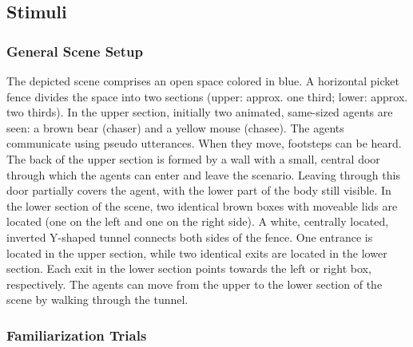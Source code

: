 \documentclass[
  man, donotrepeattitle,floatsintext]{apa6}
\begin{document}
\subsection{Stimuli}\label{stimuli}

\subsubsection{General Scene Setup}\label{general-scene-setup}

The depicted scene comprises an open space colored in blue. A horizontal picket fence divides the space into two sections (upper: approx. one third; lower: approx. two thirds). In the upper section, initially two animated, same-sized agents are seen: a brown bear (chaser) and a yellow mouse (chasee). The agents communicate using pseudo utterances. When they move, footsteps can be heard. The back of the upper section is formed by a wall with a small, central door through which the agents can enter and leave the scenario. Leaving through this door partially covers the agent, with the lower part of the body still visible. In the lower section of the scene, two identical brown boxes with moveable lids are located (one on the left and one on the right side). A white, centrally located, inverted Y-shaped tunnel connects both sides of the fence. One entrance is located in the upper section, while two identical exits are located in the lower section. Each exit in the lower section points towards the left or right box, respectively. The agents can move from the upper to the lower section of the scene by walking through the tunnel.

\subsubsection{Familiarization Trials}\label{familiarization-trials}
\end{document}

